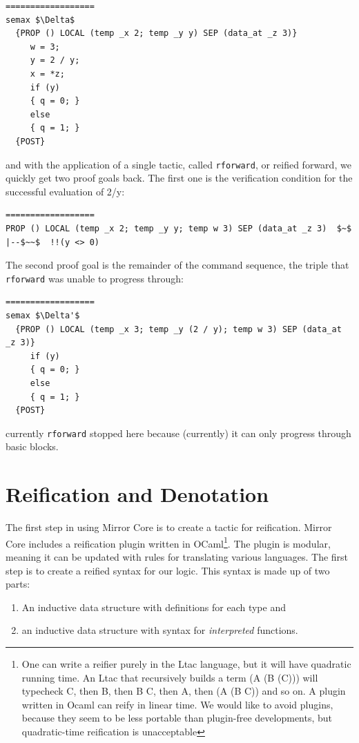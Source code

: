 \documentclass{puthesis}
\begin{document}
\begin{lstlisting}
==================
semax $\Delta$ 
  {PROP () LOCAL (temp _x 2; temp _y y) SEP (data_at _z 3)} 
     w = 3;
     y = 2 / y; 
     x = *z;
     if (y) 
     { q = 0; }
     else
     { q = 1; }
  {POST}
\end{lstlisting}

and with the application of a single tactic, called
\lstinline|rforward|, or reified forward, we quickly get two proof
goals back.  The first one is the verification condition for the
successful evaluation of 2/y:

\begin{lstlisting}
================== 
PROP () LOCAL (temp _x 2; temp _y y; temp w 3) SEP (data_at _z 3)  $~$ |--$~~$  !!(y <> 0) 
\end{lstlisting}

The second proof goal is the remainder of the command sequence, the
triple that \lstinline|rforward| was unable to progress through:

 
\begin{lstlisting}
==================
semax $\Delta'$ 
  {PROP () LOCAL (temp _x 3; temp _y (2 / y); temp w 3) SEP (data_at _z 3)} 
     if (y) 
     { q = 0; }
     else
     { q = 1; }
  {POST}
\end{lstlisting}
\noindent currently \lstinline|rforward| stopped here because
(currently) it can only progress through basic blocks.

\section{Reification and Denotation}
\label{sec:reification}
The first step in using Mirror Core is to create a tactic for
reification. Mirror Core includes a reification plugin written in
OCaml\footnote{One can write a reifier purely in the Ltac language,
  but it will have quadratic running time. An Ltac that recursively
  builds a term (A (B (C))) will typecheck C, then B, then B C, then
  A, then (A (B C)) and so on. A plugin written in Ocaml can reify in
  linear time.  We would like to avoid plugins, because they seem to
  be less portable than plugin-free developments, but quadratic-time
  reification is unacceptable}.  The plugin is modular, meaning it
can be updated with rules for translating various languages. The first
step is to create a reified syntax for our logic. This syntax is made
up of two parts:

\begin{enumerate}
\item An inductive data structure with definitions for each type and
\item an inductive data structure with syntax for \emph{interpreted}
  functions.
\end{enumerate}
\end{document}
